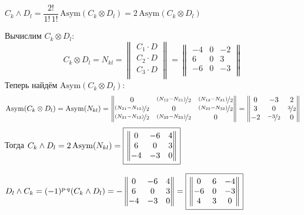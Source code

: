 \documentclass{article}
\newcommand*\squared[1]{\tikz[baseline=(char.base)]{
            \node[shape=rectangle,draw,inner sep=4pt] (char) {#1};}}
\begin{document}
\begin{center}
$C_k \wedge D_l = \dfrac{2!}{1!\,1!}\,\text{Asym}(C_k\otimes D_l) = 2\,\text{Asym}(C_k\otimes D_l)$
\end{center}
Вычислим $C_k\otimes D_l$:
$$C_k\otimes D_l = N_{kl} = \begin{Vmatrix}
C_1 \cdot D \\
C_2 \cdot D \\
C_3 \cdot D \\
\end{Vmatrix} = \begin{Vmatrix}
-4 & 0 & -2 \\
6 & 0 & 3 \\
-6 & 0 & -3 \\
\end{Vmatrix}$$
Теперь найдём $\text{Asym}(C_k\otimes D_l)$:
$$\text{Asym}(C_k\otimes D_l) = \text{Asym}(N_{kl}) = \begin{Vmatrix}
0 & \nicefrac{(N_{12} - N_{21})}{2} & \nicefrac{(N_{13} - N_{31})}{2} \\
\nicefrac{(N_{21} - N_{12})}{2} & 0 & \nicefrac{(N_{23} - N_{32})}{2} \\
\nicefrac{(N_{31} - N_{13})}{2} & \nicefrac{(N_{32} - N_{23})}{2} & 0
\end{Vmatrix} = \begin{Vmatrix}
0 & -3 & 2 \\
3 & 0 & \nicefrac{3}{2} \\
-2 & \nicefrac{-3}{2} & 0
\end{Vmatrix}$$
Тогда $C_k\wedge D_l = 2\,\text{Asym}(N_{kl}) = \squared{$\begin{Vmatrix}
0 & -6 & 4 \\
6 & 0 & 3 \\
-4 & -3 & 0
\end{Vmatrix}$}$
\, \\
\begin{center}
$D_l \wedge C_k = (-1)^{p\cdot q}(C_k\wedge D_l) = - \begin{Vmatrix}
0 & -6 & 4 \\
6 & 0 & 3 \\
-4 & -3 & 0
\end{Vmatrix} = \squared{$\begin{Vmatrix}
0 & 6 & -4 \\
-6 & 0 & -3 \\
4 & 3 & 0
\end{Vmatrix}$}$
\end{center}
\end{document}
